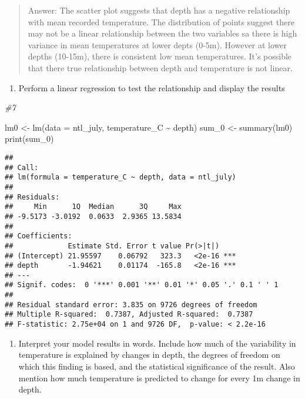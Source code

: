 \documentclass[
]{article}
\newenvironment{Shaded}{\begin{snugshade}}{\end{snugshade}}
\newcommand{\AttributeTok}[1]{\textcolor[rgb]{0.77,0.63,0.00}{#1}}
\newcommand{\CommentTok}[1]{\textcolor[rgb]{0.56,0.35,0.01}{\textit{#1}}}
\newcommand{\FunctionTok}[1]{\textcolor[rgb]{0.00,0.00,0.00}{#1}}
\newcommand{\NormalTok}[1]{#1}
\newcommand{\OtherTok}[1]{\textcolor[rgb]{0.56,0.35,0.01}{#1}}
\newcommand{\SpecialCharTok}[1]{\textcolor[rgb]{0.00,0.00,0.00}{#1}}
\providecommand{\tightlist}{%
  \setlength{\itemsep}{0pt}\setlength{\parskip}{0pt}}
\begin{document}
\begin{quote}
Answer: The scatter plot suggests that depth has a negative relationship
with mean recorded temperature. The distribution of points suggest there
may not be a linear relationship between the two variables sa there is
high variance in mean temperatures at lower depts (0-5m). However at
lower depths (10-15m), there is consistent low mean temperatures. It's
possible that there true relationship between depth and temperature is
not linear.
\end{quote}

\begin{enumerate}
\def\labelenumi{\arabic{enumi}.}
\setcounter{enumi}{6}
\tightlist
\item
  Perform a linear regression to test the relationship and display the
  results
\end{enumerate}

\begin{Shaded}
\begin{Highlighting}[]
\CommentTok{\#7}

\NormalTok{lm0 }\OtherTok{\textless{}{-}} \FunctionTok{lm}\NormalTok{(}\AttributeTok{data =}\NormalTok{ ntl\_july, temperature\_C }\SpecialCharTok{\textasciitilde{}}\NormalTok{ depth)}
\NormalTok{sum\_0 }\OtherTok{\textless{}{-}} \FunctionTok{summary}\NormalTok{(lm0)}
\FunctionTok{print}\NormalTok{(sum\_0)}
\end{Highlighting}
\end{Shaded}

\begin{verbatim}
## 
## Call:
## lm(formula = temperature_C ~ depth, data = ntl_july)
## 
## Residuals:
##     Min      1Q  Median      3Q     Max 
## -9.5173 -3.0192  0.0633  2.9365 13.5834 
## 
## Coefficients:
##             Estimate Std. Error t value Pr(>|t|)    
## (Intercept) 21.95597    0.06792   323.3   <2e-16 ***
## depth       -1.94621    0.01174  -165.8   <2e-16 ***
## ---
## Signif. codes:  0 '***' 0.001 '**' 0.01 '*' 0.05 '.' 0.1 ' ' 1
## 
## Residual standard error: 3.835 on 9726 degrees of freedom
## Multiple R-squared:  0.7387, Adjusted R-squared:  0.7387 
## F-statistic: 2.75e+04 on 1 and 9726 DF,  p-value: < 2.2e-16
\end{verbatim}

\begin{enumerate}
\def\labelenumi{\arabic{enumi}.}
\setcounter{enumi}{7}
\tightlist
\item
  Interpret your model results in words. Include how much of the
  variability in temperature is explained by changes in depth, the
  degrees of freedom on which this finding is based, and the statistical
  significance of the result. Also mention how much temperature is
  predicted to change for every 1m change in depth.
\end{enumerate}
\end{document}
